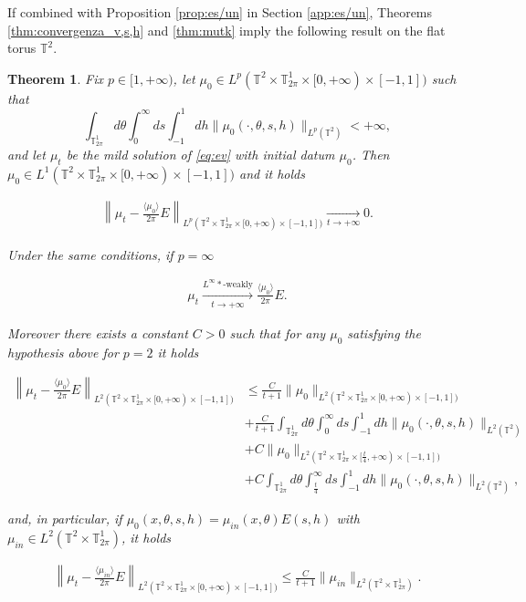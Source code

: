 \documentclass[a4paper,10pt,reqno]{amsart}
\newtheorem{theorem}{Theorem}[section]
\numberwithin{equation}{subsection}
\numberwithin{figure}{subsection}
\begin{document}
If combined with Proposition \ref{prop:es/un} in Section \ref{app:es/un}, Theorems \ref{thm:convergenza_v,s,h} and \ref{thm:mutk} imply the following result on the flat torus $\mathbb{T}^2$.
\begin{theorem}\label{thm:conv_x,v,s,h}
Fix $p\in[1,+\infty)$, let $\mu_0\in L^p(\mathbb{T}^2\times\mathbb{T}^1_{2\pi}\times[0,+\infty)\times[-1,1])$ such that
\[
\int_{\mathbb{T}^1_{2\pi}}d\theta\int_0^{\infty}ds\int_{-1}^1dh\|\mu_0(\cdot,\theta,s,h)\|_{L^p(\mathbb{T}^2)}<+\infty,
\]
and let $\mu_t$ be the mild solution of  \eqref{eq:ev} with initial datum $\mu_0$. Then $\mu_0\in L^1(\mathbb{T}^2\times\mathbb{T}^1_{2\pi}\times[0,+\infty)\times[-1,1])$ and it holds

\begin{align}\label{thm3:st1}
\left\|\mu_t-\frac{\langle\mu_0\rangle}{2\pi}E\right\|_{L^p(\mathbb{T}^2\times\mathbb{T}^1_{2\pi}\times[0,+\infty)\times[-1,1])}\xrightarrow[t\to+\infty]{}0.
\end{align}

Under the same conditions, if $p=\infty$

\begin{align}\label{thm3:st2}
\mu_t\xrightarrow[t\to+\infty]{L^{\infty}*\textrm{-weakly}}\frac{\langle\mu_0\rangle}{2\pi}E.
\end{align}

Moreover there exists a constant $C>0$ such that for any $\mu_0$ satisfying the hypothesis above for $p=2$ it holds

{\small\begin{align}
\nonumber\left\|\mu_t-\frac{\langle\mu_0\rangle}{2\pi}E\right\|_{L^2(\mathbb{T}^2\times\mathbb{T}^1_{2\pi}\times[0,+\infty)\times[-1,1])}&\leq\frac{C}{t+1}\|\mu_0\|_{L^2(\mathbb{T}^2\times\mathbb{T}^1_{2\pi}\times[0,+\infty)\times[-1,1])}
\\
\nonumber&+\frac{C}{t+1}\int_{\mathbb{T}^1_{2\pi}}d\theta\int_0^{\infty}ds\int_{-1}^1dh\|\mu_0(\cdot,\theta,s,h)\|_{L^2(\mathbb{T}^2)}
\\
\nonumber&+C\|\mu_0\|_{L^2(\mathbb{T}^2\times\mathbb{T}^1_{2\pi}\times[\frac{t}{4},+\infty)\times[-1,1])}
\\
\label{thm3:st3}&+C\int_{\mathbb{T}^1_{2\pi}}d\theta\int_{\frac{t}{4}}^{\infty}ds\int_{-1}^1dh\|\mu_0(\cdot,\theta,s,h)\|_{L^2(\mathbb{T}^2)},
\end{align}}

and, in particular, if $\mu_0(x,\theta,s,h)=\mu_{in}(x,\theta)E(s,h)$ with $\mu_{in}\in L^2(\mathbb{T}^2\times\mathbb{T}^1_{2\pi})$, it holds

\begin{align}\label{thm3:st4}
\left\|\mu_t-\frac{\langle\mu_{in}\rangle}{2\pi}E\right\|_{L^2(\mathbb{T}^2\times\mathbb{T}^1_{2\pi}\times[0,+\infty)\times[-1,1])}\leq\frac{C}{t+1}\|\mu_{in}\|_{L^2(\mathbb{T}^2\times\mathbb{T}^1_{2\pi})}.
\end{align}

\end{theorem}
\end{document}
